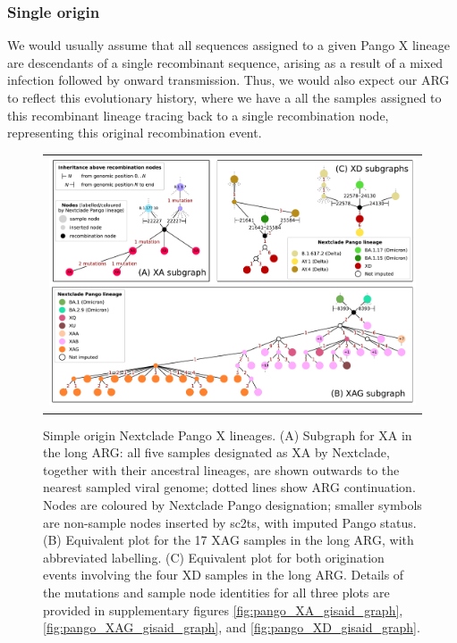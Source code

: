 \documentclass{article}
\begin{document}
\subsubsection{Single origin}
We would usually assume that all sequences
assigned to a given Pango X lineage are descendants of a single recombinant
sequence, arising as a result of a mixed infection followed by onward
transmission. Thus, we would also expect our ARG to reflect this evolutionary
history, where we have a all the samples assigned to this recombinant lineage
tracing back to a single recombination node, representing this original
recombination event.

\begin{figure}
\begin{tabularx}{\textwidth}{c}


\includegraphics[width=\textwidth]{figures/Pango_XA_XAG_XD_nxcld_tight_graph.pdf}
\end{tabularx} \caption{\label{fig:pango-simple-origin-graph} Simple origin
Nextclade Pango X lineages. (A) Subgraph for XA in the long ARG: all five samples designated
as XA by Nextclade, together with their ancestral lineages, are shown outwards to the nearest
sampled viral genome; dotted lines show ARG continuation. Nodes are coloured by Nextclade
Pango designation; smaller symbols are non-sample nodes inserted by sc2ts, with
imputed Pango status. (B) Equivalent plot for the 17 XAG samples in the long ARG, with abbreviated labelling.
(C) Equivalent plot for both origination events involving the four XD samples in the long ARG. Details of the mutations and sample node identities for all three plots are provided in supplementary figures \ref{fig:pango_XA_gisaid_graph}, \ref{fig:pango_XAG_gisaid_graph}, and \ref{fig:pango_XD_gisaid_graph}.
} \end{figure}
\end{document}
